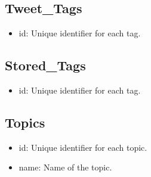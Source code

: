 \documentclass{article}
\begin{document}
\subsection*{Tweet_Tags}
\begin{itemize}
    \item id: Unique identifier for each tag.
\end{itemize}
\subsection*{Stored_Tags}
\begin{itemize}
    \item id: Unique identifier for each tag.
\end{itemize}

\subsection*{Topics}
\begin{itemize}
    \item id: Unique identifier for each topic.
    \item name: Name of the topic.
\end{itemize}
\end{document}
